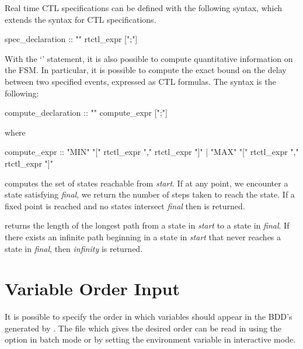%
Real time CTL specifications can be defined with the following syntax,
which extends the syntax for CTL specifications.
%
\begin{Grammar}
spec_declaration :: "" rtctl_expr [";"]
\end{Grammar}
%
With the `' statement, it is also possible to compute
quantitative information on the FSM. In particular, it is possible to
compute the exact bound on the delay between two specified events,
expressed as CTL formulas. The syntax is the following:
%
\begin{Grammar}
compute_declaration :: "" compute_expr [";"]
\end{Grammar}
%
where
%
\begin{Grammar}
compute_expr :: "MIN" "[" rtctl_expr "," rtctl_expr "]"
              | "MAX" "[" rtctl_expr "," rtctl_expr "]"
\end{Grammar}
%
 computes the set of states
reachable from \textit{start}. If at any point, we encounter a state
satisfying \textit{final}, we return the number of steps taken to
reach the state. If a fixed point is reached and no states intersect
\textit{final} then  is returned.

\noindent {} returns the length of
the longest path from a state in \textit{start} to a state in
\textit{final}. If there exists an infinite path beginning in a state
in \textit{start} that never reaches a state in \textit{final}, then
\textit{infinity} is returned.

\section{Variable Order Input}
%
It is possible to specify the order in which variables should appear
in the BDD's generated by \nusmv. The file which gives the desired
order can be read in using the  option in batch mode or
by setting the  environment variable in
interactive mode.

